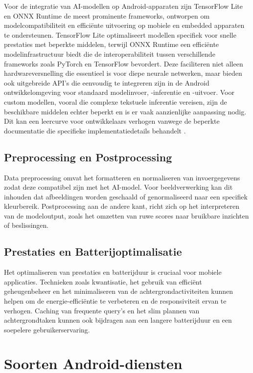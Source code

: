 Voor de integratie van AI-modellen op Android-apparaten zijn TensorFlow Lite en ONNX Runtime de meest prominente frameworks, ontworpen om modelcompatibiliteit en efficiënte uitvoering op mobiele en embedded apparaten te ondersteunen. TensorFlow Lite optimaliseert modellen specifiek voor snelle prestaties met beperkte middelen, terwijl ONNX Runtime een efficiënte modelinfrastructuur bie\-dt die de interoperabiliteit tussen verschillende frameworks zoals PyTorch en TensorFlow bevordert. Deze faciliteren niet alleen hardwareversnelling die essentieel is voor diepe neurale netwerken, maar bieden ook uitgebreide API's die eenvoudig te integreren zijn in de Android ontwikkelomgeving voor standaard modelinvoer, -inferentie en -uitvoer. Voor custom modellen, vooral die complexe tekstuele inferentie vereisen, zijn de beschikbare middelen echter beperkt en is er vaak aanzienlijke aanpassing nodig. Dit kan een leercurve voor ontwikkelaars verhogen vanwege de beperkte documentatie die specifieke implementatiedetails behandelt \autocite{Openja2022}.

\subsection{Preprocessing en Postprocessing}

Data preprocessing omvat het formatteren en normaliseren van invoergegevens zodat deze compatibel zijn met het AI-model. Voor beeldverwerking kan dit inhouden dat afbeeldingen worden geschaald of genormaliseerd naar een specifiek kleurbereik. Postprocessing aan de andere kant, richt zich op het interpreteren van de modeloutput, zoals het omzetten van ruwe scores naar bruikbare inzichten of beslissingen.

\subsection{Prestaties en Batterijoptimalisatie}

Het optimaliseren van prestaties en batterijduur is cruciaal voor mobiele applicaties. Technieken zoals kwantisatie, het gebruik van efficiënt geheugenbeheer en het minimaliseren van de achtergrondactiviteiten kunnen helpen om de energie-efficiëntie te verbeteren en de responsiviteit ervan te verhogen. Caching van frequente query's en het slim plannen van achtergrondtaken kunnen ook bijdragen aan een langere batterijduur en een soepelere gebruikerservaring.


\section{Soorten Android-diensten}

